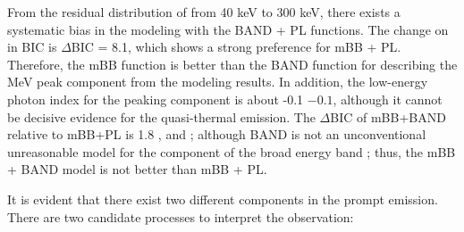 \documentclass[prd,twocolumn,amsmath,amssymb,aps,linenumbers]{revtex4-2} %
\providecommand{\DIFaddtex}[1]{{\protect\color{blue} \sf #1}} %
\providecommand{\DIFdeltex}[1]{{\protect\color{red} \scriptsize #1}} %
\providecommand{\DIFaddbegin}{} %
\providecommand{\DIFaddend}{} %
\providecommand{\DIFdelbegin}{} %
\providecommand{\DIFdelend}{} %
\providecommand{\DIFadd}[1]{\texorpdfstring{\DIFaddtex{#1}}{#1}} %
\providecommand{\DIFdel}[1]{\texorpdfstring{\DIFdeltex{#1}}{}} %
\newcommand{\DIFscaledelfig}{0.5}
\newlength{\DIFdelgraphicswidth} %
\newlength{\DIFdelgraphicsheight} %
\newcommand{\DIFaddincludegraphics}[2][]{{\color{blue}\fbox{\DIFOincludegraphics[#1]{#2}}}} %
\newcommand{\DIFdelincludegraphics}[2][]{%
\sbox{\DIFdelgraphicsbox}{\DIFOincludegraphics[#1]{#2}}%
\settoboxwidth{\DIFdelgraphicswidth}{\DIFdelgraphicsbox} %
\settoboxtotalheight{\DIFdelgraphicsheight}{\DIFdelgraphicsbox} %
\scalebox{\DIFscaledelfig}{%
\parbox[b]{\DIFdelgraphicswidth}{\usebox{\DIFdelgraphicsbox}\\[-\baselineskip] \rule{\DIFdelgraphicswidth}{0em}}\llap{\resizebox{\DIFdelgraphicswidth}{\DIFdelgraphicsheight}{%
\setlength{\unitlength}{\DIFdelgraphicswidth}%
\begin{picture}(1,1)%
\thicklines\linethickness{2pt} %
{\color[rgb]{1,0,0}\put(0,0){\framebox(1,1){}}}%
{\color[rgb]{1,0,0}\put(0,0){\line( 1,1){1}}}%
{\color[rgb]{1,0,0}\put(0,1){\line(1,-1){1}}}%
\end{picture}%
}\hspace*{3pt}}} %
} %
\DeclareRobustCommand{\DIFaddbegin}{\DIFOaddbegin \let\includegraphics\DIFaddincludegraphics} %
\DeclareRobustCommand{\DIFaddend}{\DIFOaddend \let\includegraphics\DIFOincludegraphics} %
\DeclareRobustCommand{\DIFdelbegin}{\DIFOdelbegin \let\includegraphics\DIFdelincludegraphics} %
\DeclareRobustCommand{\DIFdelend}{\DIFOaddend \let\includegraphics\DIFOincludegraphics} %
\begin{document}
From the residual distribution \DIFdelbegin \DIFdel{of }\DIFdelend \DIFaddbegin \DIFadd{from }\DIFaddend 40 keV to 300 keV, there exists a systematic bias in the modeling with \DIFaddbegin \DIFadd{the }\DIFaddend BAND + PL functions. The change \DIFdelbegin \DIFdel{on }\DIFdelend \DIFaddbegin \DIFadd{in }\DIFaddend BIC is $\Delta$BIC = 8.1, which shows a strong preference for mBB + PL. Therefore, the mBB function is better than the BAND function for describing the MeV peak component from the modeling results. In addition, the low-energy photon index for the peaking component is about \DIFdelbegin \DIFdel{-0.1}\DIFdelend \DIFaddbegin \DIFadd{$-0.1$}\DIFaddend , although it cannot be decisive evidence for the quasi-thermal emission. The $\Delta$BIC of mBB+BAND \DIFaddbegin \DIFadd{relative }\DIFaddend to mBB+PL is 1.8\DIFdelbegin \DIFdel{, and }\DIFdelend \DIFaddbegin \DIFadd{; although }\DIFaddend BAND is not an \DIFdelbegin \DIFdel{unconventional }\DIFdelend \DIFaddbegin \DIFadd{unreasonable }\DIFaddend model for the component of the broad energy band\DIFdelbegin \DIFdel{; thus}\DIFdelend , the mBB + BAND model is not better than mBB + PL.

It is evident that there exist two different components in the prompt emission. There are two candidate processes to interpret the observation:
\end{document}
